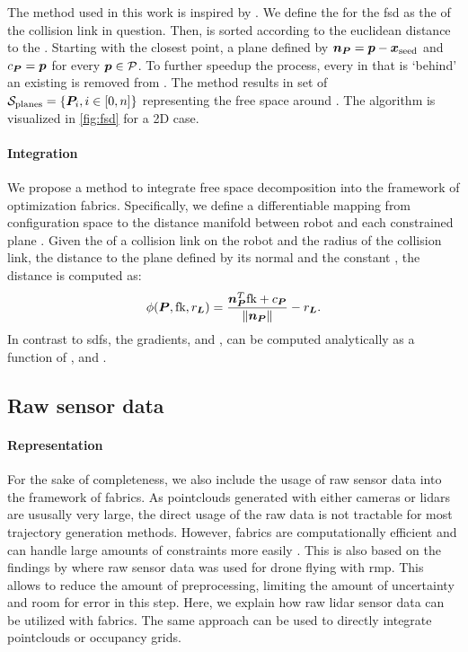 The method used in this work is inspired by \cite{Liu2017a}. We define the
\seed{} for the \ac{fsd} as the \fk{} of the collision link in question. Then,
\pointcloud{} is sorted according to the euclidean distance to the \seed{}.
Starting with the closest point, a plane \plane{} defined by $\bm{n}_{\bm{P}} = \bm{p} -
\bm{x}_{\textrm{seed}}$ and $c_{\bm{P}} = \bm{p}$ for every $\bm{p} \in \mathcal{P}$. To further
speedup the process, every \point{} in \pointcloud{} that is `behind' an
existing \plane{} is removed from \pointcloud{}. The method results in set
of $\mathcal{S}_{\textrm{planes}} = \{\bm{P}_i, i\in[0,n]\}$ representing the free
space around \seed{}. The algorithm is visualized in \cref{fig:fsd} for a 2D
case.

\paragraph{Integration}
We propose a method to integrate free space
decomposition into the framework of optimization \ac{fabrics}. Specifically, we
define a differentiable mapping from configuration space \Q{} to the distance
manifold between robot and each constrained plane \plane{}.
Given the \fk{} of a collision link on the robot and the radius of the
collision link, the distance to the plane \plane{} defined by its normal
\np{} and the constant \cp{}, the distance is computed as:
\begin{equation}
  \phi({\bm{P},\textrm{fk},r_{\bm{L}}}) = \frac{\bm{n}_{\bm{P}}^T\textrm{fk} + c_{\bm{P}}}{\left\lVert\bm{n}_{\bm{P}}\right\rVert} - r_{\bm{L}}
  \label{eq:point_plane_distance}.
\end{equation}
In contrast to \acp{sdf}, the gradients, \J{} and \Jdot{}, can be
computed analytically as a function of \q{}, \np{} and \cp{}.



\subsection{Raw sensor data}
\label{sub:raw_sensor_data}

\paragraph{Representation}
For the sake of completeness, we also include the usage of
raw sensor data into the framework of \ac{fabrics}. As
pointclouds generated with either cameras or lidars are
ususally very large, the direct usage of the raw data is not
tractable for most trajectory generation methods. However,
\ac{fabrics} are computationally efficient and can handle
large amounts of constraints more easily \cite{Spahn2023}.
This is also based on the findings by
\cite{Pantic2023obstacle} where raw sensor data was used for
drone flying with \ac{rmp}.
This allows to reduce the amount of preprocessing,
limiting the amount of uncertainty and room for error in this step. Here, we
explain how raw lidar sensor data can be utilized with \ac{fabrics}.
The same approach can be used to directly integrate pointclouds or occupancy
grids.

